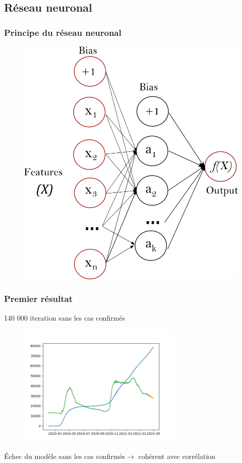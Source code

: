 \documentclass{beamer}
\begin{document}
\subsection{Réseau neuronal}
\begin{frame}
	\frametitle{Principe du réseau neuronal}
	\begin{figure}[t]
		\centering
		\begin{minipage}{0.5\textwidth}
			\includegraphics[scale=0.2]{nn_sk}
		\end{minipage}
	\end{figure}
\end{frame}

\begin{frame}
	\frametitle{Premier résultat}
	140 000 iteration sans les cas confirmés
	\begin{figure}[h]
		\centering
		\includegraphics[width=0.7\textwidth]{NN mlpregressor 140k iter (updated data)}
	\end{figure}
	Échec du modèle sans les cas confirmés$\rightarrow$ cohérent avec corrélation
\end{frame}
\end{document}
